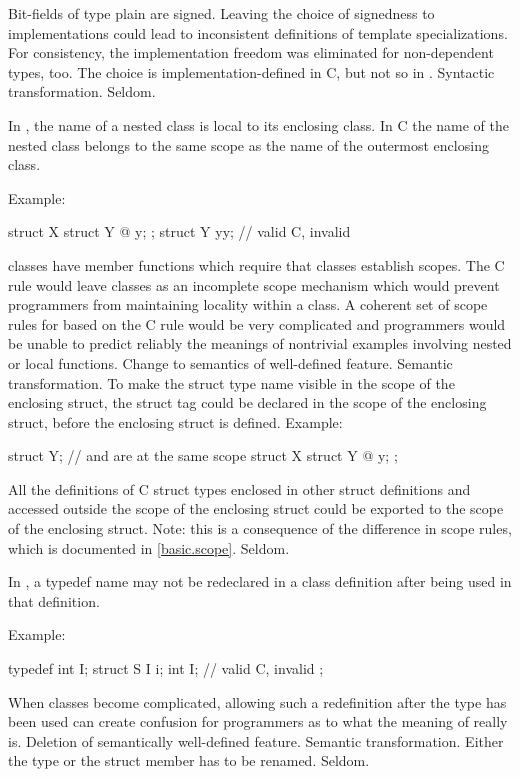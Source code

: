 \change
{}%
Bit-fields of type plain  are signed.
\rationale
Leaving the choice of signedness to implementations could lead to
inconsistent definitions of template specializations. For consistency,
the implementation freedom was eliminated for non-dependent types,
too.
\effect
The choice is implementation-defined in C, but not so in \Cpp{}.
\difficulty
Syntactic transformation.
\howwide
Seldom.

\change
In \Cpp{}, the name of a nested class is local to its enclosing class. In C
the name of the nested class belongs to the same scope as the name of the outermost enclosing class.

Example:
\begin{codeblock}
struct X {
  struct Y { @\commentellip@ } y;
};
struct Y yy;                    // valid C, invalid \Cpp{}
\end{codeblock}
\rationale
\Cpp{} classes have member functions which require that classes
establish scopes.
The C rule would leave classes as an incomplete scope mechanism
which would prevent \Cpp{} programmers from maintaining locality
within a class.
A coherent set of scope rules for \Cpp{} based on the C rule would
be very complicated and \Cpp{} programmers would be unable to predict
reliably the meanings of nontrivial examples involving nested or
local functions.
\effect
Change to semantics of well-defined feature.
\difficulty
Semantic transformation.
To make the struct type name visible in the scope of the enclosing
struct, the struct tag could be declared in the scope of the
enclosing struct, before the enclosing struct is defined.
Example:
\begin{codeblock}
struct Y;                       //  and  are at the same scope
struct X {
  struct Y { @\commentellip@ } y;
};
\end{codeblock}

All the definitions of C struct types enclosed in other struct
definitions and accessed outside the scope of the enclosing
struct could be exported to the scope of the enclosing struct.
Note: this is a consequence of the difference in scope rules,
which is documented in \ref{basic.scope}.
\howwide
Seldom.

\change
In \Cpp{}, a typedef name may not be redeclared in a class definition after being used in that definition.

Example:
\begin{codeblock}
typedef int I;
struct S {
  I i;
  int I;            // valid C, invalid \Cpp{}
};
\end{codeblock}
\rationale
When classes become complicated, allowing such a redefinition
after the type has been used can create confusion for \Cpp{}
programmers as to what the meaning of  really is.
\effect
Deletion of semantically well-defined feature.
\difficulty
Semantic transformation.
Either the type or the struct member has to be renamed.
\howwide
Seldom.

